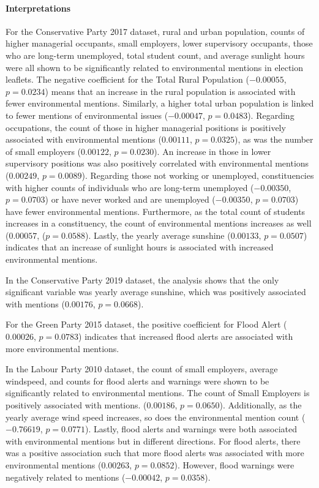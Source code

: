 \documentclass[12pt,letterpaper]{article}
\begin{document}
\paragraph{Interpretations}

For the Conservative Party 2017 dataset, rural and urban population, counts of higher managerial occupants, small employers, lower supervisory occupants, those who are long-term unemployed, total student count, and average sunlight hours were all shown to be significantly related to environmental mentions in election leaflets. The negative coefficient for the Total Rural Population (\(-0.00055\), \(p = 0.0234\)) means that an increase in the rural population is associated with fewer environmental mentions. Similarly, a higher total urban population is linked to fewer mentions of environmental issues (\(-0.00047\), \(p = 0.0483\)). Regarding occupations, the count of those in higher managerial positions is positively associated with environmental mentions (\(0.00111\), \(p = 0.0325\)), as was the number of small employers (\(0.00122\), \(p = 0.0230\)). An increase in those in lower supervisory positions was also positively correlated with environmental mentions (\(0.00249\), \(p = 0.0089\)). Regarding those not working or unemployed, constituencies with higher counts of individuals who are long-term unemployed (\(-0.00350\), \(p = 0.0703\)) or have never worked and are unemployed (\(-0.00350\), \(p = 0.0703\)) have fewer environmental mentions. Furthermore, as the total count of students increases in a constituency, the count of environmental mentions increases as well (\(0.00057\), (\(p = 0.0588\)). Lastly, the yearly average sunshine (\(0.00133\), \(p = 0.0507\)) indicates that an increase of sunlight hours is associated with increased environmental mentions.

In the Conservative Party 2019 dataset, the analysis shows that the only significant variable was yearly average sunshine, which was positively associated with mentions (\(0.00176\), \(p = 0.0668\)).


For the Green Party 2015 dataset, the positive coefficient for Flood Alert (\(0.00026\), \(p = 0.0783\)) indicates that increased flood alerts are associated with more environmental mentions.


In the Labour Party 2010 dataset, the count of small employers, average windspeed, and counts for flood alerts and warnings were shown to be significantly related to environmental mentions. The count of Small Employers is positively associated with mentions. (\(0.00186\), \(p = 0.0650\)). Additionally, as the yearly average wind speed increases, so does the environmental mention count (\(-0.76619\), \(p = 0.0771\)). Lastly, flood alerts and warnings were both associated with environmental mentions but in different directions. For flood alerts, there was a positive association such that more flood alerts was associated with more environmental mentions (\(0.00263\), \(p = 0.0852\)). However, flood warnings were negatively related to mentions (\(-0.00042\), \(p = 0.0358\)).
\end{document}
